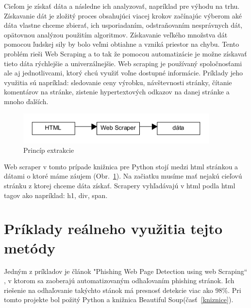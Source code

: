 \documentclass[10pt,twoside,slovak,a4paper]{article}
\begin{document}
Cieľom je získať dáta a následne ich analyzovať, napríklad pre výhodu na trhu. Získavanie dát je zložitý proces obsahujúci viacej krokov začínajúc výberom aké dáta vlastne chceme zbierať, ich usporiadaním, odstraňovaním nesprávnych dát, opätovnou analýzou použitím algoritmov\cite{8822022}.
Získavanie veľkého množstva dát pomocou ľudskej sily by bolo veľmi obtiahne a vzniká priestor na chybu\cite{10145369}. Tento problém rieši Web Scraping a to tak že pomocou automatizácie je možne získavať tieto dáta rýchlejšie a univerzálnejšie. Web scraping je používaný spoločnosťami ale aj jednotlivcami, ktorý chcú využiť voľne dostupné informácie\cite{10145369}. Príklady jeho využitia sú napríklad: sledovanie ceny výrobku, návštevnosti stránky,  čítanie komentárov na stránke, zistenie hypertextových odkazov na danej stránke a mnoho ďalších\cite{10250745}.

\begin{figure}[tbh]
    \centering
    \includegraphics[width= 0.9\textwidth]{diag.png}
    \caption{Princíp extrakcie}
    \label{f:diagram}
\end{figure}

Web scraper v tomto prípade knižnica pre Python stojí medzi html stránkou a dátami o ktoré máme záujem (Obr.~\ref{f:diagram}). Na začiatku musíme mať nejakú cieľovú stránku z ktorej chceme dáta získať. Scrapery vyhľadávajú v html podla html tagov ako napríklad: h1, div, span\cite{9215357}.


\section{Príklady reálneho využitia tejto metódy}\label{usecase}
Jedným z príkladov je článok "Phishing Web Page Detection using web Scraping“ \cite{10115148}, v ktorom sa zaoberajú automatizovaným odhaľovaním phishing stránok. Ich riešenie na odhaľovanie takýchto stánok má presnosť detekcie viac ako 98\%. Pri tomto projekte bol požitý Python a knižnica Beautiful Soup(časť~\ref{kniznice}).
\end{document}
